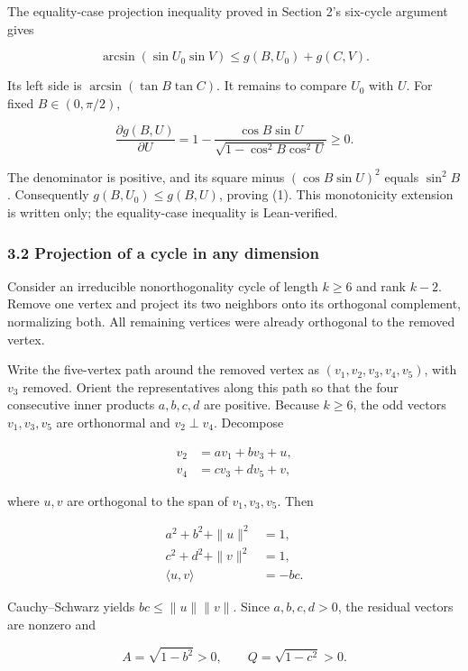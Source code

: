 \documentclass[11pt,a4paper]{article}
\begin{document}
The equality-case projection inequality proved in Section 2's six-cycle argument gives

\[
\arcsin(\sin U_0\sin V)\le g(B,U_0)+g(C,V).
\]

Its left side is \(\arcsin(\tan B\tan C)\). It remains to compare \(U_0\) with \(U\). For fixed \(B\in(0,\pi/2)\),

\[
\frac{\partial g(B,U)}{\partial U}=1-\frac{\cos B\sin U}{\sqrt{1-\cos^2B\cos^2U}}\ge0.
\]

The denominator is positive, and its square minus \((\cos B\sin U)^2\) equals \(\sin^2 B\). Consequently \(g(B,U_0)\le g(B,U)\), proving (1). This monotonicity extension is written only; the equality-case inequality is Lean-verified.

\subsubsection{3.2 Projection of a cycle in any dimension}\label{projection-of-a-cycle-in-any-dimension}

Consider an irreducible nonorthogonality cycle of length \(k\ge6\) and rank \(k-2\). Remove one vertex and project its two neighbors onto its orthogonal complement, normalizing both. All remaining vertices were already orthogonal to the removed vertex.

Write the five-vertex path around the removed vertex as \((v_1,v_2,v_3,v_4,v_5)\), with \(v_3\) removed. Orient the representatives along this path so that the four consecutive inner products \(a,b,c,d\) are positive. Because \(k\ge6\), the odd vectors \(v_1,v_3,v_5\) are orthonormal and \(v_2\perp v_4\). Decompose

\[
\begin{aligned}v_2&=av_1+bv_3+u,\\v_4&=cv_3+dv_5+v,\end{aligned}
\]

where \(u,v\) are orthogonal to the span of \(v_1,v_3,v_5\). Then

\[
\begin{aligned}a^2+b^2+\|u\|^2&=1,\\c^2+d^2+\|v\|^2&=1,\\\langle u,v\rangle&=-bc.\end{aligned}
\]

Cauchy--Schwarz yields \(bc\le\|u\|\|v\|\). Since \(a,b,c,d>0\), the residual vectors are nonzero and

\[
A=\sqrt{1-b^2}>0,\qquad Q=\sqrt{1-c^2}>0.
\]
\end{document}
